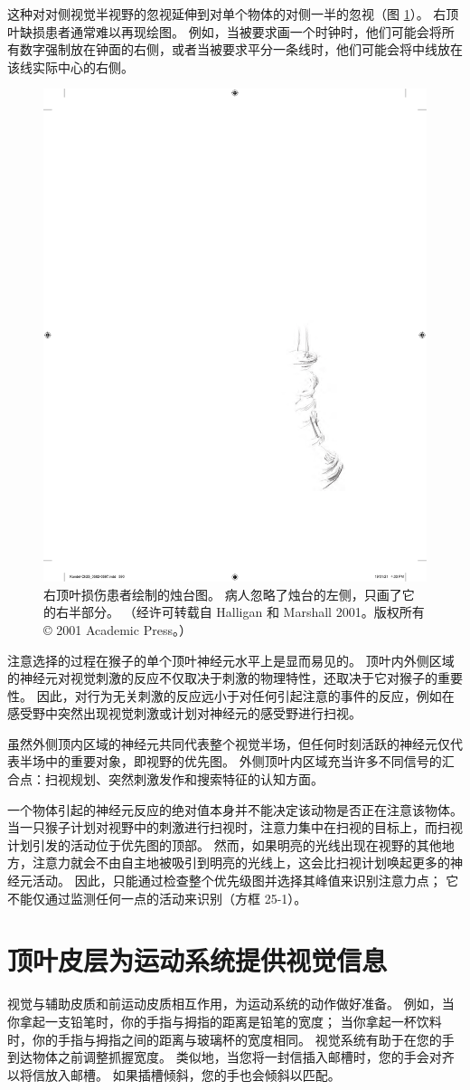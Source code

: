 这种对对侧视觉半视野的忽视延伸到对单个物体的对侧一半的忽视（图 \ref{fig:25_9}）。 
右顶叶缺损患者通常难以再现绘图。 例如，当被要求画一个时钟时，他们可能会将所有数字强制放在钟面的右侧，或者当被要求平分一条线时，他们可能会将中线放在该线实际中心的右侧。


\begin{figure}[htbp]
	\centering
	\includegraphics[width=0.5\linewidth]{chap25/fig_25_9}
	\caption{右顶叶损伤患者绘制的烛台图。 病人忽略了烛台的左侧，只画了它的右半部分。 （经许可转载自 Halligan 和 Marshall 2001。版权所有 © 2001 Academic Press。）}
	\label{fig:25_9}
\end{figure}


注意选择的过程在猴子的单个顶叶神经元水平上是显而易见的。 顶叶内外侧区域的神经元对视觉刺激的反应不仅取决于刺激的物理特性，还取决于它对猴子的重要性。 因此，对行为无关刺激的反应远小于对任何引起注意的事件的反应，例如在感受野中突然出现视觉刺激或计划对神经元的感受野进行扫视。

虽然外侧顶内区域的神经元共同代表整个视觉半场，但任何时刻活跃的神经元仅代表半场中的重要对象，即视野的优先图。 外侧顶叶内区域充当许多不同信号的汇合点：扫视规划、突然刺激发作和搜索特征的认知方面。

一个物体引起的神经元反应的绝对值本身并不能决定该动物是否正在注意该物体。 当一只猴子计划对视野中的刺激进行扫视时，注意力集中在扫视的目标上，而扫视计划引发的活动位于优先图的顶部。 然而，如果明亮的光线出现在视野的其他地方，注意力就会不由自主地被吸引到明亮的光线上，这会比扫视计划唤起更多的神经元活动。 因此，只能通过检查整个优先级图并选择其峰值来识别注意力点； 它不能仅通过监测任何一点的活动来识别（方框 25-1）。


\section{顶叶皮层为运动系统提供视觉信息}
视觉与辅助皮质和前运动皮质相互作用，为运动系统的动作做好准备。 例如，当你拿起一支铅笔时，你的手指与拇指的距离是铅笔的宽度； 当你拿起一杯饮料时，你的手指与拇指之间的距离与玻璃杯的宽度相同。 视觉系统有助于在您的手到达物体之前调整抓握宽度。 类似地，当您将一封信插入邮槽时，您的手会对齐以将信放入邮槽。 如果插槽倾斜，您的手也会倾斜以匹配。

